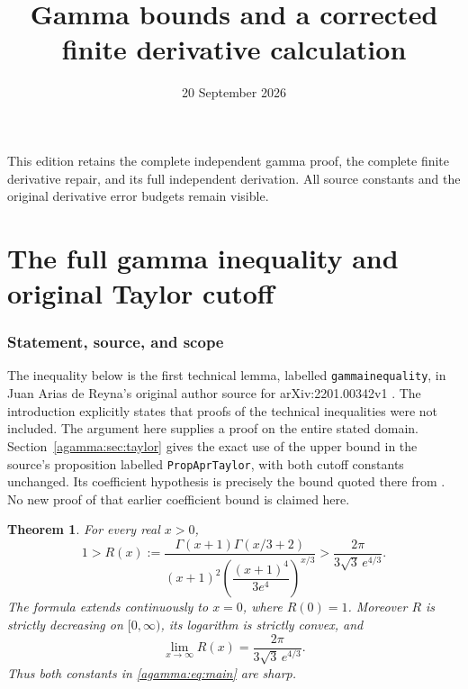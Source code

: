 \documentclass[11pt]{article}
\begin{document}
\title{Gamma bounds and a corrected finite derivative calculation}
\author{}\date{20 September 2026}\maketitle
This edition retains the complete independent gamma proof, the complete
finite derivative repair, and its full independent derivation. All source
constants and the original derivative error budgets remain visible.


\clearpage\begingroup
\part*{The full gamma inequality and original Taylor cutoff}
\newtheorem{agammatheorem}{Theorem}
\newtheorem{agammalemma}[agammatheorem]{Lemma}
\newtheorem{agammaproposition}[agammatheorem]{Proposition}
\newtheorem{agammacorollary}[agammatheorem]{Corollary}
\newcommand{\agammaR}{\mathbb R}
\newcommand{\agammaN}{\mathbb N}
\newcommand{\agammaeps}{\varepsilon}



\section{Statement, source, and scope}\label{agamma:sec:scope}
The inequality below is the first technical lemma, labelled
\texttt{gammainequality}, in Juan Arias de Reyna's original author source
for arXiv:2201.00342v1 \cite[Section 3.10]{agamma:AriasII}. The introduction
explicitly states that proofs of the technical inequalities were not
included. The argument here supplies a proof on the entire stated
domain. Section~\ref{agamma:sec:taylor} gives the exact use of the upper bound
in the source's proposition labelled \texttt{PropAprTaylor}, with both
cutoff constants unchanged. Its coefficient hypothesis is precisely
the bound quoted there from \cite[formulas (47) and (56)]{agamma:AriasI}.
No new proof of that earlier coefficient bound is claimed here.

\begin{agammatheorem}\label{agamma:thm:gamma}
For every real $x>0$,
\begin{equation}\label{agamma:eq:main}
1>
R(x):=\frac{\Gamma(x+1)\Gamma(x/3+2)}
{(x+1)^2\left(\dfrac{(x+1)^4}{3e^4}\right)^{x/3}}
>\frac{2\pi}{3\sqrt3\,e^{4/3}}.
\end{equation}
The formula extends continuously to $x=0$, where $R(0)=1$.
Moreover $R$ is strictly decreasing on $[0,\infty)$, its logarithm
is strictly convex, and
\begin{equation}\label{agamma:eq:Rlimit}
\lim_{x\to\infty}R(x)=\frac{2\pi}{3\sqrt3\,e^{4/3}}.
\end{equation}
Thus both constants in \eqref{agamma:eq:main} are sharp.
\end{agammatheorem}
\end{document}

